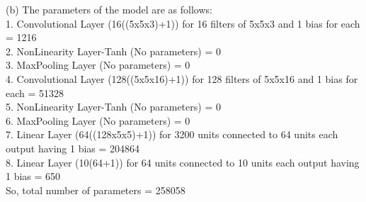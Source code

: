 \documentclass[11pt]{article}
\begin{document}
(b) The parameters of the model are as follows: \\
1. Convolutional Layer (16((5x5x3)+1)) for 16 filters of 5x5x3 and 1 bias for each  = 1216\\
2. NonLinearity Layer-Tanh (No parameters) = 0\\
3. MaxPooling Layer (No parameters) = 0\\
4. Convolutional Layer (128((5x5x16)+1)) for 128 filters of 5x5x16 and 1 bias for each  = 51328\\
5. NonLinearity Layer-Tanh (No parameters) = 0 \\
6. MaxPooling Layer (No parameters) = 0\\
7. Linear Layer (64((128x5x5)+1)) for 3200 units connected to 64 units each output having 1 bias = 204864\\
8. Linear Layer (10(64+1)) for 64 units connected to 10 units each output having 1 bias = 650 \\
So, total number of parameters = 258058
\end{document}
